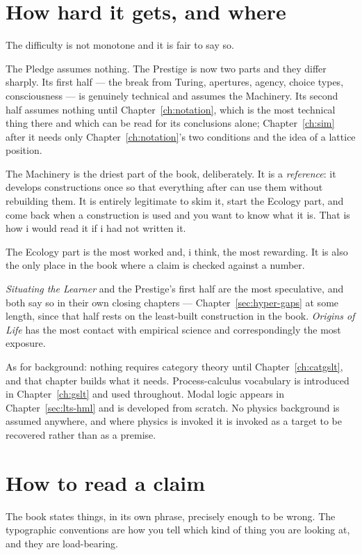 \section*{How hard it gets, and where}

The difficulty is not monotone and it is fair to say so.

The Pledge assumes nothing.
The Prestige is now two parts and they differ sharply.
Its first half --- the break from Turing, apertures, agency, choice
types, consciousness --- is genuinely technical and assumes the
Machinery.
Its second half assumes nothing until Chapter~\ref{ch:notation}, which
is the most technical thing there and which can be read for its
conclusions alone; Chapter~\ref{ch:sim} after it needs only
Chapter~\ref{ch:notation}'s two conditions and the idea of a lattice
position.

The Machinery is the driest part of the book, deliberately.
It is a \emph{reference}: it develops constructions once so that
everything after can use them without rebuilding them.
It is entirely legitimate to skim it, start the Ecology part, and
come back when a construction is used and you want to know what it
is.
That is how i would read it if i had not written it.

The Ecology part is the most worked and, i think, the most
rewarding.
It is also the only place in the book where a claim is checked
against a number.

\emph{Situating the Learner} and the Prestige's first half are the most
speculative, and both say so in their own closing chapters ---
Chapter~\ref{sec:hyper-gaps} at some length, since that half rests on
the least-built construction in the book.
\emph{Origins of Life} has the most contact with empirical
science and correspondingly the most exposure.

As for background: nothing requires category theory until
Chapter~\ref{ch:catgslt}, and that chapter builds what it needs.
Process-calculus vocabulary is introduced in
Chapter~\ref{ch:gslt} and used throughout.
Modal logic appears in Chapter~\ref{sec:lts-hml} and is developed
from scratch.
No physics background is assumed anywhere, and where physics is
invoked it is invoked as a target to be recovered rather than as a
premise.

\section*{How to read a claim}

The book states things, in its own phrase, precisely enough to be
wrong.
The typographic conventions are how you tell which kind of thing
you are looking at, and they are load-bearing.

